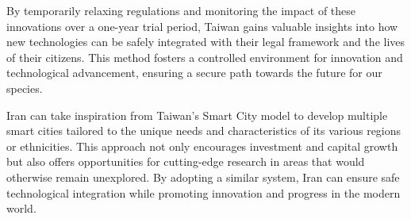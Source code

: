 \documentclass{IEEEtran}
\begin{document}
By temporarily relaxing regulations and monitoring the impact of these innovations over a one-year trial period, Taiwan gains valuable insights into how new technologies can be safely integrated with their legal framework and the lives of their citizens. This method fosters a controlled environment for innovation and technological advancement, ensuring a secure path towards the future for our species.

Iran can take inspiration from Taiwan's Smart City model to develop multiple smart cities tailored to the unique needs and characteristics of its various regions or ethnicities. This approach not only encourages investment and capital growth but also offers opportunities for cutting-edge research in areas that would otherwise remain unexplored. By adopting a similar system, Iran can ensure safe technological integration while promoting innovation and progress in the modern world.




\end{document}
